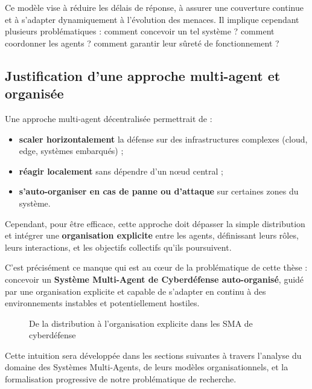 \documentclass[ twoside,openright,titlepage,numbers=noenddot,headinclude,%
                footinclude=true,cleardoublepage=empty,abstractoff, %
                BCOR=5mm,paper=a4,fontsize=11pt,%
                french,american,%
                ]{scrreprt}
\begin{document}
Ce modèle vise à réduire les délais de réponse, à assurer une couverture continue et à s’adapter dynamiquement à l’évolution des menaces. Il implique cependant plusieurs problématiques : comment concevoir un tel système ? comment coordonner les agents ? comment garantir leur sûreté de fonctionnement ?

\vspace{0.5em}
\subsection*{Justification d’une approche multi-agent et organisée}

Une approche multi-agent décentralisée permettrait de :
\begin{itemize}
    \item \textbf{scaler horizontalement} la défense sur des infrastructures complexes (cloud, edge, systèmes embarqués) ;
    \item \textbf{réagir localement} sans dépendre d’un nœud central ;
    \item \textbf{s’auto-organiser en cas de panne ou d’attaque} sur certaines zones du système.
\end{itemize}

Cependant, pour être efficace, cette approche doit dépasser la simple distribution et intégrer une \textbf{organisation explicite} entre les agents, définissant leurs rôles, leurs interactions, et les objectifs collectifs qu’ils poursuivent.

C’est précisément ce manque qui est au cœur de la problématique de cette thèse : concevoir un \textbf{Système Multi-Agent de Cyberdéfense auto-organisé}, guidé par une organisation explicite et capable de s’adapter en continu à des environnements instables et potentiellement hostiles.

\begin{figure}[H]
    \centering
    \caption{De la distribution à l'organisation explicite dans les SMA de cyberdéfense}
    \label{fig:orga-sma-cyber}
\end{figure}

Cette intuition sera développée dans les sections suivantes à travers l’analyse du domaine des Systèmes Multi-Agents, de leurs modèles organisationnels, et la formalisation progressive de notre problématique de recherche.
\end{document}
